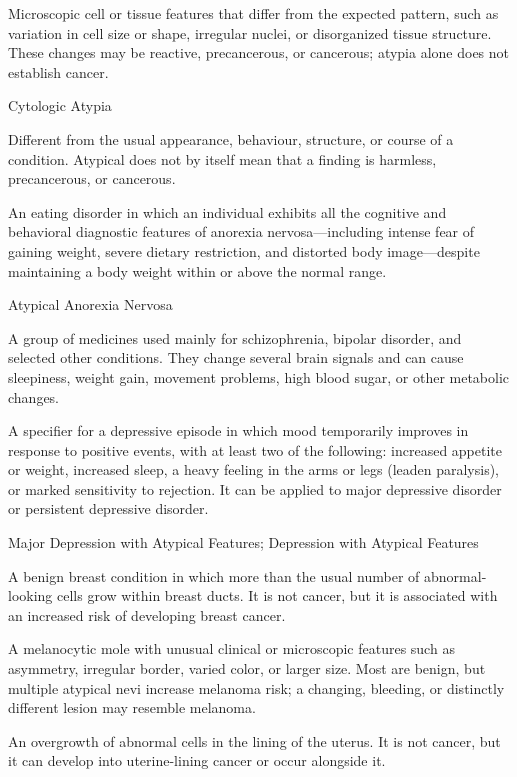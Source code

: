  Microscopic cell or tissue features that differ from the expected pattern, such as variation in cell size or shape, irregular nuclei, or disorganized tissue structure. These changes may be reactive, precancerous, or cancerous; atypia alone does not establish cancer.

\synonyms
Cytologic Atypia

 Different from the usual appearance, behaviour, structure, or course of a condition. Atypical does not by itself mean that a finding is harmless, precancerous, or cancerous.

 An eating disorder in which an individual exhibits all the cognitive and behavioral diagnostic features of anorexia nervosa---including intense fear of gaining weight, severe dietary restriction, and distorted body image---despite maintaining a body weight within or above the normal range.

\synonyms
Atypical Anorexia Nervosa

 A group of medicines used mainly for schizophrenia, bipolar disorder, and selected other conditions. They change several brain signals and can cause sleepiness, weight gain, movement problems, high blood sugar, or other metabolic changes.

 A specifier for a depressive episode in which mood temporarily improves in response to positive events, with at least two of the following: increased appetite or weight, increased sleep, a heavy feeling in the arms or legs (leaden paralysis), or marked sensitivity to rejection. It can be applied to major depressive disorder or persistent depressive disorder.

\synonyms
Major Depression with Atypical Features; Depression with Atypical Features

 A benign breast condition in which more than the usual number of abnormal-looking cells grow within breast ducts. It is not cancer, but it is associated with an increased risk of developing breast cancer.

 A melanocytic mole with unusual clinical or microscopic features such as asymmetry, irregular border, varied color, or larger size. Most are benign, but multiple atypical nevi increase melanoma risk; a changing, bleeding, or distinctly different lesion may resemble melanoma.

 An overgrowth of abnormal cells in the lining of the uterus. It is not cancer, but it can develop into uterine-lining cancer or occur alongside it.

